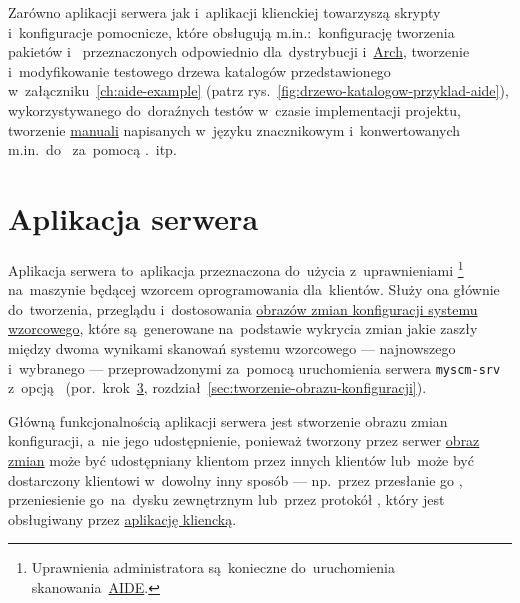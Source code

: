 \documentclass[thesis]{subfiles}
\begin{document}
Zarówno aplikacji serwera jak i~aplikacji klienckiej towarzyszą skrypty i~konfiguracje pomocnicze, które obsługują m.in.:~konfigurację tworzenia pakietów  i~ przeznaczonych odpowiednio dla~dystrybucji  \debian{} i~\href{https://en.wikipedia.org/wiki/Arch_Linux}{Arch}, tworzenie i~modyfikowanie testowego drzewa katalogów przedstawionego w~załączniku~\ref{ch:aide-example} (patrz rys.~\ref{fig:drzewo-katalogow-przyklad-aide}), wykorzystywanego do~doraźnych testów w~czasie implementacji projektu, tworzenie \href{https://en.wikipedia.org/wiki/User_guide}{manuali} napisanych w~języku znacznikowym  i~konwertowanych m.in.~do~ za~pomocą .~itp.


\section{Aplikacja serwera}
\label{sec:srv-app}

Aplikacja serwera to~aplikacja przeznaczona do~użycia z~uprawnieniami \superuser{}\footnote{Uprawnienia administratora są~konieczne do~uruchomienia skanowania~\hyperref[sec:aide]{AIDE}.} na~maszynie będącej wzorcem oprogramowania dla~klientów. Służy ona głównie do~tworzenia, przeglądu i~dostosowania \hyperref[sec:obraz-zmian-konfiguracji]{obrazów zmian konfiguracji systemu wzorcowego}, które są~generowane na~podstawie wykrycia zmian jakie zaszły między dwoma wynikami skanowań systemu wzorcowego --- najnowszego i~wybranego --- przeprowadzonymi za~pomocą uruchomienia serwera \texttt{myscm-srv} z~opcją ~(por.~krok~\hyperlink{itm:stworzenie-obrazu-konfiguracji}{3}, rozdział~\ref{sec:tworzenie-obrazu-konfiguracji}).

Główną funkcjonalnością aplikacji serwera jest stworzenie obrazu zmian konfiguracji, a~nie jego udostępnienie, ponieważ tworzony przez serwer \hyperref[sec:obraz-zmian-konfiguracji]{obraz zmian} może być udostępniany klientom przez innych klientów lub~może być dostarczony klientowi w~dowolny inny sposób --- np.~przez przesłanie go , przeniesienie go~na~dysku zewnętrznym lub~przez protokół \sftp{}, który jest obsługiwany przez \hyperref[sec:cli-app]{aplikację kliencką}.
\end{document}
